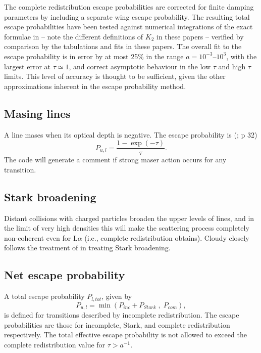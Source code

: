 The complete redistribution escape probabilities are corrected for
finite damping parameters by including a separate wing escape
probability.  The resulting total escape probabilities have been
tested against numerical integrations of the exact formulae in
\cite{Avrett1966,Hummer1982b} -- note the different definitions of
$K_2$ in these papers -- verified by comparison by the tabulations and
fits in these papers.  The overall fit to the escape probability is in
error by at most 25\% in the range $a=10^{-3}\mbox{--}10^3$, with the
largest error at $\tau\simeq 1$, and correct asymptotic behaviour in
the low $\tau$ and high $\tau$ limits.  This level of accuracy is
thought to be sufficient, given the other approximations inherent in
the escape probability method.

\subsection{Masing lines }

A line mases when its optical depth is negative.
The escape probability is (\citealp{Elitzur1992}; p 32)
\begin{equation}
{P_{u,l}} = \frac{{1 - \exp \left( { - \tau } \right)}}{\tau }.%
\end{equation}
The code will generate a comment if strong maser action occurs for any
transition.

\subsection{Stark broadening }

Distant collisions with charged particles broaden the upper levels of
lines, and in the limit of very high densities this will make the scattering
process completely non-coherent even for L$\alpha $ (i.e., complete redistribution
obtains).
Cloudy closely follows the treatment of \citet{Puetter1981} in treating
Stark broadening.

\subsection{Net escape probability }

A total escape probability $P_{l, tot}$, given by
\begin{equation}
{P_{u,l}} = \min \left( {{P_{inc}} + {P_{Stark}}\;,\;{P_{com}}} \right),%
\end{equation}
is defined for transitions described by incomplete redistribution.  The
escape probabilities are those for incomplete, Stark, and complete
redistribution respectively.  The total effective escape probability is
not allowed to exceed the complete redistribution value for
$\tau > a^{-1}$.

